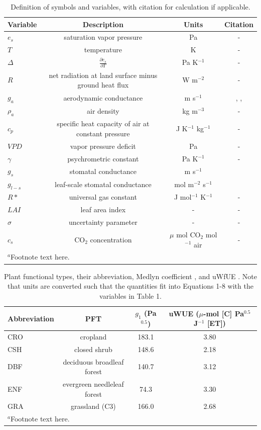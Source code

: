 \documentclass[draft,linenumbers]{agujournal}
\begin{document}
\begin{table}
\caption{Definition of symbols and variables, with citation for calculation if applicable.}
\centering
\begin{tabular}{l c c c}
\hline
 Variable & Description & Units & Citation \\
\hline
$e_s$  & saturation vapor pressure & Pa  & - \\ 
$T$  & temperature  & K & - \\
$\Delta$  & $\frac{\partial e_s}{\partial T}$ & Pa K$^{-1}$ & - \\
$R$  & net radiation at land surface minus ground heat flux & W m$^{-2}$   & - \\
  $g_a$  & aerodynamic conductance & m s$^{-1}$  & \cite{Thom_1977}, \cite{Paulson_1970}, \cite{Beljaars_1991} \\
  $\rho_a$  & air density & kg m$^{-3}$  & - \\
  $c_p$  & specific heat capacity of air at constant pressure & J K$^{-1}$ kg$^{-1}$ & - \\
  $VPD$  & vapor pressure deficit & Pa  & - \\
  $\gamma$  & psychrometric constant & Pa K$^{-1}$   & - \\
  $g_s$  & stomatal conductance & m s$^{-1}$  & \cite{MEDLYN_2011} \\
  $g_{l-s}$  & leaf-scale stomatal conductance & mol m$^{-2}$ s$^{-1}$  & \cite{MEDLYN_2011} \\
  $R*$ & universal gas constant & J mol$^{-1}$ K$^{-1}$ & - \\
  $LAI$ & leaf area index & -& - \\
  $\sigma$ & uncertainty parameter & -& - \\
  $c_s$ & CO$_2$ concentration & $\mu$ mol CO$_2$ mol$^{-1}$ air& - \\
\hline
\multicolumn{2}{l}{$^{a}$Footnote text here.}
\end{tabular}
\end{table}




\begin{table}
  \label{pft}
\caption{Plant functional types, their abbreviation, Medlyn coefficient \citep[from ][]{Lin_2015}, and uWfUE \citep[from ][]{Zhou_2015}. Note that units are converted such that the quantities fit into Equations 1-8 with the variables in Table 1.}
\centering
\begin{tabular}{l c c c}
  \hline
  Abbreviation & PFT & $g_1$ (Pa$^{0.5}$) & uWUE ($\mu$-mol [C] Pa$^{0.5}$ J$^{-1}$ [ET])  \\
  \hline
  CRO & cropland & 183.1 & 3.80 \\
  CSH & closed shrub & 148.6 & 2.18 \\
  DBF & deciduous broadleaf forest & 140.7 & 3.12 \\
  ENF & evergreen needleleaf forest & 74.3 & 3.30 \\
  GRA & grassland (C3) & 166.0 & 2.68 \\
\hline
\multicolumn{2}{l}{$^{a}$Footnote text here.}
\end{tabular}
\end{table}
\end{document}
